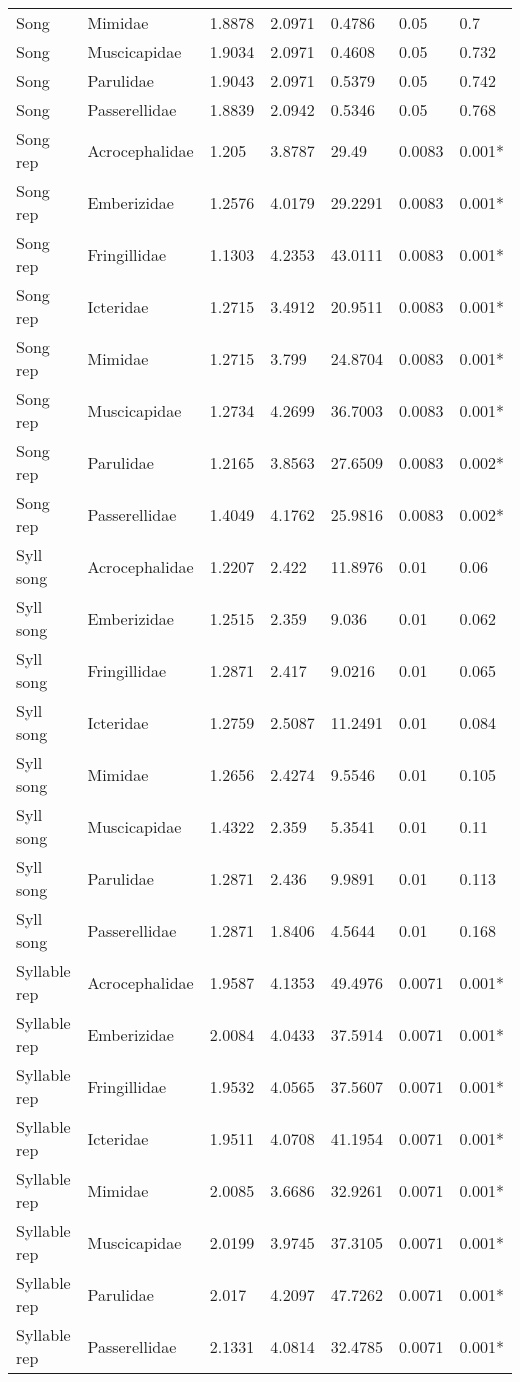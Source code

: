 \documentclass{article}\usepackage[]{graphicx}\usepackage[]{color}
\begin{document}
\begin{table}[ht]
\begin{tabular}{lllllll}
  Song & Mimidae & 1.8878 & 2.0971 & 0.4786 & 0.05 & 0.7 \\ 
  Song & Muscicapidae & 1.9034 & 2.0971 & 0.4608 & 0.05 & 0.732 \\ 
  Song & Parulidae & 1.9043 & 2.0971 & 0.5379 & 0.05 & 0.742 \\ 
  Song & Passerellidae & 1.8839 & 2.0942 & 0.5346 & 0.05 & 0.768 \\ 
  Song rep & Acrocephalidae & 1.205 & 3.8787 & 29.49 & 0.0083 & 0.001* \\ 
  Song rep & Emberizidae & 1.2576 & 4.0179 & 29.2291 & 0.0083 & 0.001* \\ 
  Song rep & Fringillidae & 1.1303 & 4.2353 & 43.0111 & 0.0083 & 0.001* \\ 
  Song rep & Icteridae & 1.2715 & 3.4912 & 20.9511 & 0.0083 & 0.001* \\ 
  Song rep & Mimidae & 1.2715 & 3.799 & 24.8704 & 0.0083 & 0.001* \\ 
  Song rep & Muscicapidae & 1.2734 & 4.2699 & 36.7003 & 0.0083 & 0.001* \\ 
  Song rep & Parulidae & 1.2165 & 3.8563 & 27.6509 & 0.0083 & 0.002* \\ 
  Song rep & Passerellidae & 1.4049 & 4.1762 & 25.9816 & 0.0083 & 0.002* \\ 
  Syll song & Acrocephalidae & 1.2207 & 2.422 & 11.8976 & 0.01 & 0.06 \\ 
  Syll song & Emberizidae & 1.2515 & 2.359 & 9.036 & 0.01 & 0.062 \\ 
  Syll song & Fringillidae & 1.2871 & 2.417 & 9.0216 & 0.01 & 0.065 \\ 
  Syll song & Icteridae & 1.2759 & 2.5087 & 11.2491 & 0.01 & 0.084 \\ 
  Syll song & Mimidae & 1.2656 & 2.4274 & 9.5546 & 0.01 & 0.105 \\ 
  Syll song & Muscicapidae & 1.4322 & 2.359 & 5.3541 & 0.01 & 0.11 \\ 
  Syll song & Parulidae & 1.2871 & 2.436 & 9.9891 & 0.01 & 0.113 \\ 
  Syll song & Passerellidae & 1.2871 & 1.8406 & 4.5644 & 0.01 & 0.168 \\ 
  Syllable rep & Acrocephalidae & 1.9587 & 4.1353 & 49.4976 & 0.0071 & 0.001* \\ 
  Syllable rep & Emberizidae & 2.0084 & 4.0433 & 37.5914 & 0.0071 & 0.001* \\ 
  Syllable rep & Fringillidae & 1.9532 & 4.0565 & 37.5607 & 0.0071 & 0.001* \\ 
  Syllable rep & Icteridae & 1.9511 & 4.0708 & 41.1954 & 0.0071 & 0.001* \\ 
  Syllable rep & Mimidae & 2.0085 & 3.6686 & 32.9261 & 0.0071 & 0.001* \\ 
  Syllable rep & Muscicapidae & 2.0199 & 3.9745 & 37.3105 & 0.0071 & 0.001* \\ 
  Syllable rep & Parulidae & 2.017 & 4.2097 & 47.7262 & 0.0071 & 0.001* \\ 
  Syllable rep & Passerellidae & 2.1331 & 4.0814 & 32.4785 & 0.0071 & 0.001* \\ 
   \hline
\end{tabular}
\end{table}
\end{document}
